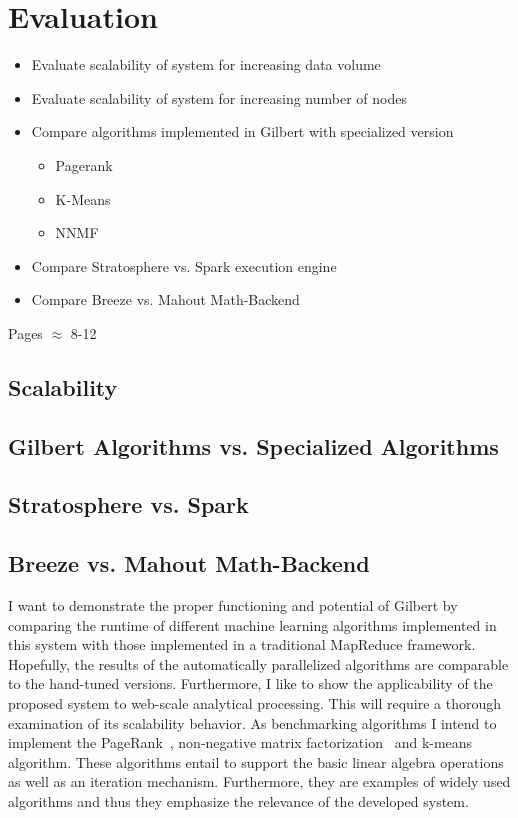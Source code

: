 \chapter{Evaluation}
\label{cha:evaluation}


\begin{itemize}
	\item Evaluate scalability of system for increasing data volume
	\item Evaluate scalability of system for increasing number of nodes
	\item Compare algorithms implemented in Gilbert with specialized version
	\begin{itemize}
		\item Pagerank
		\item K-Means
		\item NNMF
	\end{itemize}
	\item Compare Stratosphere vs. Spark execution engine
	\item Compare Breeze vs. Mahout Math-Backend
\end{itemize}

Pages $\approx$ 8-12

\section{Scalability}

\section{Gilbert Algorithms vs. Specialized Algorithms}

\section{Stratosphere vs. Spark}

\section{Breeze vs. Mahout Math-Backend}

I want to demonstrate the proper functioning and potential of Gilbert by comparing the runtime of different machine learning algorithms implemented in this system with those implemented in a traditional MapReduce framework.
Hopefully, the results of the automatically parallelized algorithms are comparable to the hand-tuned versions.
Furthermore, I like to show the applicability of the proposed system to web-scale analytical processing.
This will require a thorough examination of its scalability behavior.
As benchmarking algorithms I intend to implement the PageRank~\cite{page:1999a}, non-negative matrix factorization~\cite{seung:anips2001a} and k-means~\cite{macqueen:1967a} algorithm.
These algorithms entail to support the basic linear algebra operations as well as an iteration mechanism.
Furthermore, they are examples of widely used algorithms and thus they emphasize the relevance of the developed system.